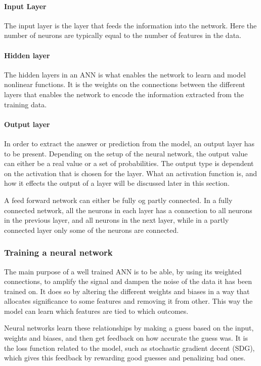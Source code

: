 \paragraph{Input Layer}
The input layer is the layer that feeds the information into the network. Here the number of neurons are typically equal to the number of features in the data.

\paragraph{Hidden layer}
The hidden layers in an ANN is what enables the network to learn and model nonlinear functions. It is the weights on the connections between the different layers that enables the network to encode the information extracted from the training data.

\paragraph{Output layer}
In order to extract the answer or prediction from the model, an output layer has to be present. Depending on the setup of the neural network, the output value can either be a real value or a set of probabilities. The output type is dependent on the activation that is chosen for the layer. What an activation function is, and how it effects the output of a layer will be discussed later in this section.

A feed forward network can either be fully og partly connected. In a fully connected network, all the neurons in each layer has a connection to all neurons in the previous layer, and all neurons in the next layer, while in a partly connected layer only some of the neurons are connected.

\subsubsection{Training a neural network}
The main purpose of a well trained ANN is to be able, by using its weighted connections, to amplify the signal and dampen the noise of the data it has been trained on. It does so by altering the different weights and biases in a way that allocates significance to some features and removing it from other. This way the model can learn which features are tied to which outcomes.

Neural networks learn these relationships by making a guess based on the input, weights and biases, and then get feedback on how accurate the guess was. It is the loss function related to the model, such as stochastic gradient decent (SDG), which gives this feedback by rewarding good guesses and penalizing bad ones.

